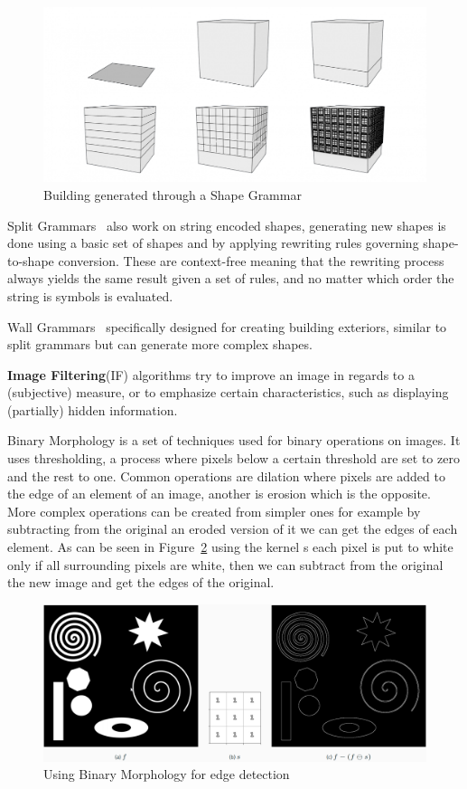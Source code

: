 \documentclass[runningheads]{llncs}
\begin{document}
\begin{figure}
    \centering
    \includegraphics[scale=0.25]{images/shapegrammar.png}
    \caption{Building generated through a Shape Grammar}
    \label{fig:shape}
\end{figure}

Split Grammars~\cite{ref_wonka} also work on string encoded shapes, generating new shapes is done using a basic set of shapes and by applying rewriting rules governing shape-to-shape conversion. These are context-free meaning that the rewriting process always yields the same result given a set of rules, and no matter which order the string is symbols is evaluated.

Wall Grammars~\cite{ref_larive} specifically designed for creating building exteriors, similar to split grammars but can generate more complex shapes.

\textbf{Image Filtering}(IF) algorithms try to improve an image in regards to a (subjective) measure, or to emphasize certain characteristics, such as displaying (partially) hidden information.

Binary Morphology is a set of techniques used for binary operations on images. It uses thresholding, a process where pixels below a certain threshold are set to zero and the rest to one. Common operations are dilation where pixels are added to the edge of an element of an image, another is erosion which is the opposite. More complex operations can be created from simpler ones for example by subtracting from the original an eroded version of it we can get the edges of each element. As can be seen in Figure~\ref{fig:binary} using the kernel s each pixel is put to white only if all surrounding pixels are white, then we can subtract from the original the new image and get the edges of the original.

\begin{figure}
    \centering
    \includegraphics[scale=0.25]{images/binarymorphology.png}
    \caption{Using Binary Morphology for edge detection}
    \label{fig:binary}
\end{figure}
\end{document}
